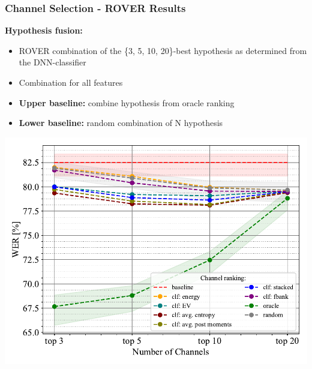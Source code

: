 \documentclass{beamer}
\begin{document}
\begin{frame}
  \frametitle{Channel Selection - ROVER Results}
  \textbf{Hypothesis fusion:}

  \begin{itemize}
    \item ROVER combination of the \{3, 5, 10, 20\}-best hypothesis as determined from the DNN-classifier
    \item Combination for all features
    \item \textbf{Upper baseline:} combine hypothesis from oracle ranking
    \item \textbf{Lower baseline:} random combination of N hypothesis
  \end{itemize}
  
  \begin{minipage}[tb]{.5\textwidth}
  {\scriptsize
  
  }
  \end{minipage}%
  \hfill
  \begin{minipage}[tb]{.5\textwidth}
  \includegraphics[width=\textwidth]{img/rover_top_results}
  \end{minipage}
\end{frame}



\end{document}

